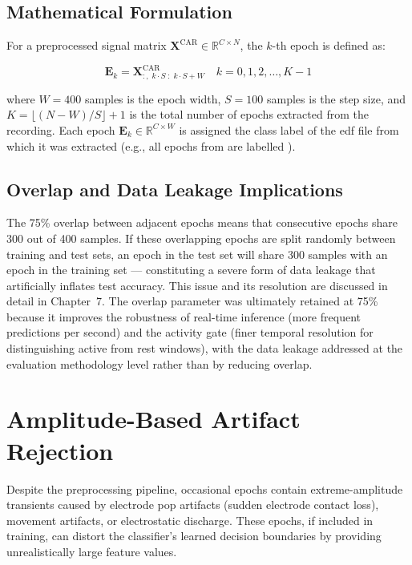 \subsection{Mathematical Formulation}

For a preprocessed signal matrix $\mathbf{X}^{\text{CAR}}
\in \mathbb{R}^{C \times N}$, the $k$-th epoch is defined as:

\begin{equation}
\mathbf{E}_k = \mathbf{X}^{\text{CAR}}_{:,\;
k \cdot S \;:\; k \cdot S + W}
\quad k = 0, 1, 2, \ldots, K-1
\label{eq:epoch}
\end{equation}

\noindent where $W = 400$ samples is the epoch width,
$S = 100$ samples is the step size, and
$K = \lfloor (N - W) / S \rfloor + 1$ is the total
number of epochs extracted from the recording. Each epoch
$\mathbf{E}_k \in \mathbb{R}^{C \times W}$ is assigned the
class label of the \acrshort{edf} file from which it was
extracted (e.g., all epochs from  are
labelled ).

\subsection{Overlap and Data Leakage Implications}

The 75\% overlap between adjacent epochs means that
consecutive epochs share 300 out of 400 samples. If these
overlapping epochs are split randomly between training and
test sets, an epoch in the test set will share 300 samples
with an epoch in the training set — constituting a severe
form of data leakage that artificially inflates test accuracy.
This issue and its resolution are discussed in detail in
Chapter~7. The overlap parameter was ultimately retained at
75\% because it improves the robustness of real-time inference
(more frequent predictions per second) and the activity gate
(finer temporal resolution for distinguishing active from rest
windows), with the data leakage addressed at the evaluation
methodology level rather than by reducing overlap.

\section{Amplitude-Based Artifact Rejection}
\label{sec:sp_reject}

Despite the preprocessing pipeline, occasional epochs contain
extreme-amplitude transients caused by electrode pop artifacts
(sudden electrode contact loss), movement artifacts, or
electrostatic discharge. These epochs, if included in training,
can distort the classifier's learned decision boundaries by
providing unrealistically large feature values.

